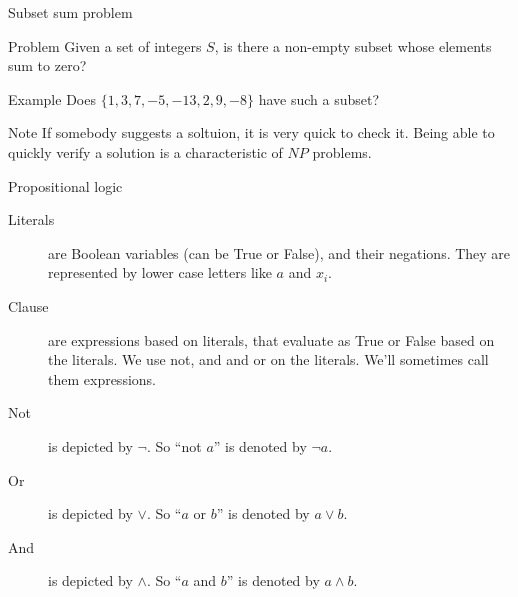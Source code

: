 \begin{frame}{Subset sum problem}
   
   {
  \begin{block}{Problem}
    Given a set of integers $S$, is there a non-empty subset whose elements sum to zero?
  \end{block}}

  \vspace{0.5cm}
  
  \begin{block}{Example}
    Does $\{ 1, 3, 7, -5, -13, 2, 9, -8 \}$ have such a subset?
  \end{block}
  
  \vspace{0.5cm}

  \begin{block}{Note}
     If somebody suggests a soltuion, it is very quick to check it.
    Being able to quickly verify a solution is a characteristic of $NP$ problems.
  \end{block}
\end{frame}


\begin{frame}{Propositional logic}
  \begin{description}
    \item[Literals] are Boolean variables (can be True or False), and their negations. They are represented by lower case letters like $a$ and $x_i$.
    \vspace{0.3cm}
    \item[Clause] are expressions based on literals, that evaluate as True or False based on the literals. We use not, and and or on the literals. We'll sometimes call them expressions.
    \vspace{0.3cm}
    \item[Not] is depicted by $\neg$. So ``not $a$'' is denoted by $\neg a$.
    \vspace{0.3cm}
    \item[Or] is depicted by $\vee$. So ``$a$ or $b$'' is denoted by $a \vee b$.
    \vspace{0.3cm}
    \item[And] is depicted by $\wedge$. So ``$a$ and $b$'' is denoted by $a \wedge b$.
  \end{description}
\end{frame}


